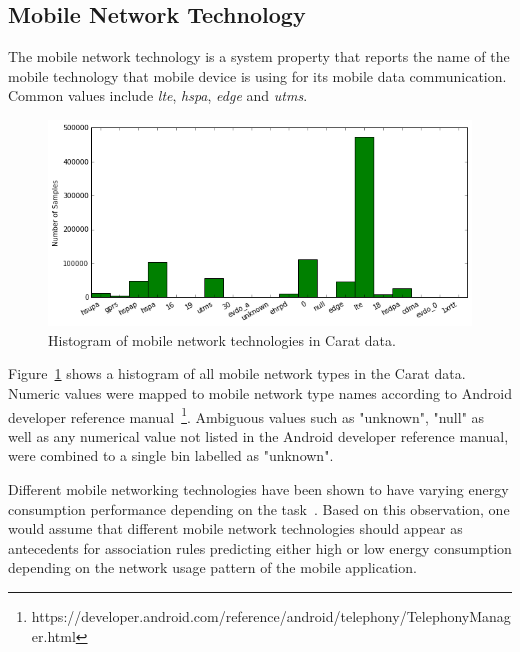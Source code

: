 \subsection{Mobile Network Technology}  

The mobile network technology is a system property that reports the name of the mobile technology that mobile device is using for its mobile data communication. Common values include \textit{lte}, \textit{hspa}, \textit{edge} and \textit{utms}.

\begin{figure} %
	\centering
	\includegraphics[width=\textwidth]{images/carat-data/mobile_net_type.png}
	\caption{Histogram of mobile network technologies in Carat data.}
	\label{figure:carat-data-mobile-net-type}
\end{figure}   

Figure~\ref{figure:carat-data-mobile-net-type} shows a histogram of all mobile network types in the Carat data. Numeric values were mapped to mobile network type names according to Android developer reference manual~\footnote{https://developer.android.com/reference/android/telephony/TelephonyManager.html}. Ambiguous values such as "unknown", "null" as well as any numerical value not listed in the Android developer reference manual, were combined to a single bin labelled as "unknown". 

Different mobile networking technologies have been shown to have varying energy consumption performance depending on the task~\cite{5357972}. Based on this observation, one would assume that different mobile network technologies should appear as antecedents for association rules predicting either high or low energy consumption depending on the network usage pattern of the mobile application.  


